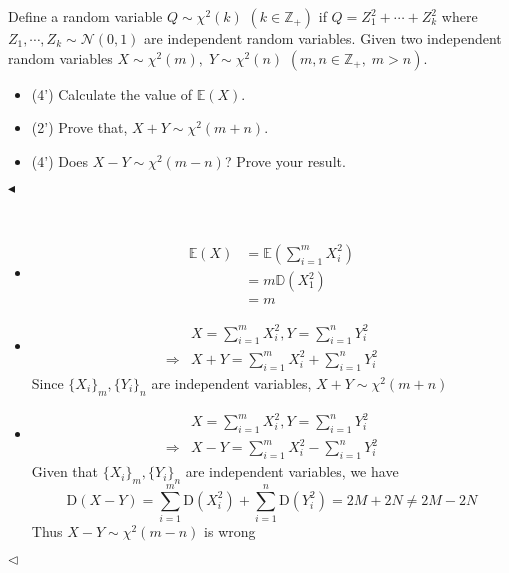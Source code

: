 \documentclass[11pt]{article}
\newenvironment{problem}[2][Problem]{\begin{trivlist}
\item[\hskip \labelsep {\bfseries #1}\hskip \labelsep {\bfseries #2.}]}{\hfill$\blacktriangleleft$\end{trivlist}}
\newenvironment{answer}[1][Answer]{\begin{trivlist}
\item[\hskip \labelsep {\bfseries #1.}\hskip \labelsep]}{\hfill$\lhd$\end{trivlist}}
\begin{document}
\begin{problem}{2 (10')}
Define a random variable $Q \sim \chi^2(k)$ $(k\in\mathbb{Z}_+)$ if $Q=Z_1^2+\cdots+Z_k^2$ where $Z_1,\cdots,Z_k \sim \mathcal{N}(0,1)$ are independent random variables. Given two independent random variables $X\sim\chi^2(m),\;Y\sim\chi^2(n)$ $(m,n\in\mathbb{Z}_+,\;m > n)$.
\begin{itemize}
    \item [(1)] (4') Calculate the value of $\mathbb{E}(X)$.
    \item [(2)] (2') Prove that, $X + Y \sim \chi^2(m + n)$.
    \item [(3)] (4') Does $X - Y \sim \chi^2(m - n)$? Prove your result.
\end{itemize}
\end{problem}

\begin{answer} ~
\begin{itemize}
    \item [(1)]
$$\begin{align*}
\mathbb{E}(X) &=\mathbb{E}\left(\sum_{i=1}^m X_i^2 \right)\\
&=m \mathbb D(X_1^2)\\
&=m
\end{align*}$$
    \item [(2)]
$$\begin{align*}&X=\sum_{i=1}^m X_i^2,Y=\sum_{i=1}^n Y_i^2\\
\Rightarrow& X+Y=\sum_{i=1}^m X_i^2+\sum_{i=1}^n Y_i^2\end{align*}$$
Since $\{X_i\}_m,\{Y_i\}_n$ are independent variables, $X+Y \sim \chi^2(m+n)$
    \item [(3)] 
$$\begin{align*}&X=\sum_{i=1}^m X_i^2,Y=\sum_{i=1}^n Y_i^2\\
\Rightarrow& X-Y=\sum_{i=1}^m X_i^2-\sum_{i=1}^n Y_i^2\end{align*}$$
Given that $\{X_i\}_m,\{Y_i\}_n$ are independent variables, we have
$$\mathrm{D}(X-Y)=\sum_{i=1}^m \mathrm D(X_i^2)+\sum_{i=1}^n \mathrm D(Y_i^2)=2M+2N\neq 2M-2N$$
Thus $X-Y \sim \chi^2(m-n)$ is wrong
\end{itemize}
\end{answer}
\end{document}
